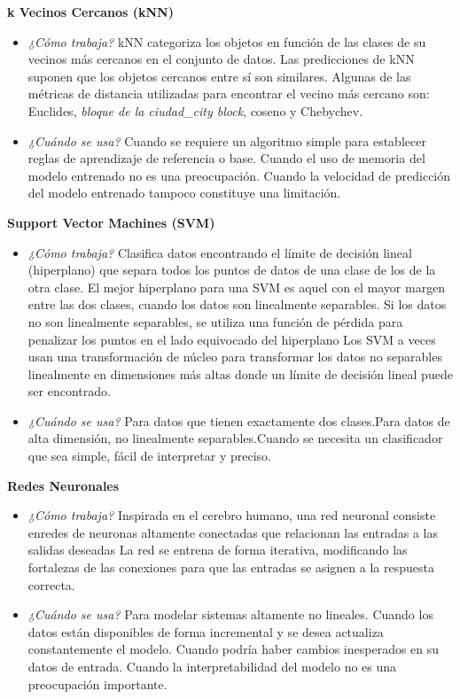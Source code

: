 \documentclass[]{book}
\begin{document}
\textbf{k Vecinos Cercanos (kNN)}

\begin{itemize}
\item
  \emph{¿Cómo trabaja?} kNN categoriza los objetos en función de las clases de su
  vecinos más cercanos en el conjunto de datos. Las predicciones de kNN suponen
  que los objetos cercanos entre sí son similares. Algunas de las métricas de distancia utilizadas para encontrar el vecino más cercano son: Euclides, \emph{bloque de la ciudad\_city block}, coseno y Chebychev.
\item
  \emph{¿Cuándo se usa?} Cuando se requiere un algoritmo simple para establecer
  reglas de aprendizaje de referencia o base. Cuando el uso de memoria del modelo entrenado no es una preocupación.
  Cuando la velocidad de predicción del modelo entrenado tampoco constituye una limitación.
\end{itemize}

\textbf{Support Vector Machines (SVM)}

\begin{itemize}
\item
  \emph{¿Cómo trabaja?} Clasifica datos encontrando el límite de decisión lineal (hiperplano) que separa todos los puntos de datos de una clase de los de la otra clase. El mejor hiperplano para una SVM es aquel con el mayor margen entre las dos clases, cuando los datos son linealmente separables. Si los datos no son linealmente separables, se utiliza una función de pérdida para penalizar los puntos en el lado equivocado del hiperplano Los SVM a veces usan una transformación de núcleo para transformar los datos no separables linealmente en dimensiones más altas donde un límite de decisión lineal puede ser encontrado.
\item
  \emph{¿Cuándo se usa?} Para datos que tienen exactamente dos clases.Para datos de alta dimensión, no linealmente separables.Cuando se necesita un clasificador que sea simple, fácil de interpretar y preciso.
\end{itemize}

\textbf{Redes Neuronales}

\begin{itemize}
\item
  \emph{¿Cómo trabaja?} Inspirada en el cerebro humano, una red neuronal consiste enredes de neuronas altamente conectadas que relacionan las entradas a las salidas deseadas La red se entrena de forma iterativa, modificando las fortalezas de las conexiones para que las entradas se asignen a la respuesta correcta.
\item
  \emph{¿Cuándo se usa?} Para modelar sistemas altamente no lineales. Cuando los datos están disponibles de forma incremental y se desea actualiza constantemente el modelo. Cuando podría haber cambios inesperados en su
  datos de entrada. Cuando la interpretabilidad del modelo no es una preocupación importante.
\end{itemize}
\end{document}
